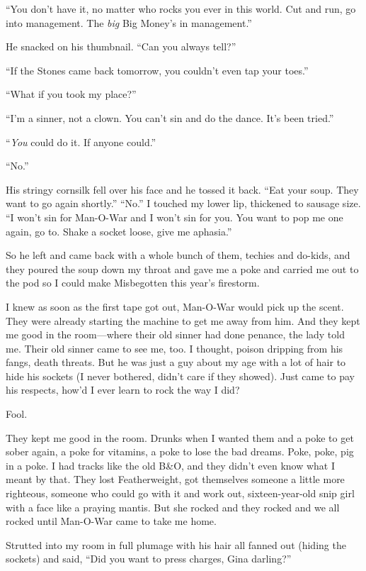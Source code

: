 ``You don't have it, no matter who rocks you ever in this world. Cut and run, go into management. The \textit{big} Big Money's in management.''

He snacked on his thumbnail. ``Can you always tell?''

``If the Stones came back tomorrow, you couldn't even tap your toes.''

``What if you took my place?''

``I'm a sinner, not a clown. You can't sin and do the dance. It's been tried.''

``\textit{You} could do it. If anyone could.''

``No.''

His stringy cornsilk fell over his face and he tossed it back. ``Eat your soup. They want to go again shortly.''
``No.'' I touched my lower lip, thickened to sausage size. ``I won't sin for Man-O-War and I won't sin for you. You want to pop me one again, go to. Shake a socket loose, give me aphasia.''

So he left and came back with a whole bunch of them, techies and do-kids, and they poured the soup down my throat and gave me a poke and carried me out to the pod so I could make Misbegotten this year's firestorm.

I knew as soon as the first tape got out, Man-O-War would pick up the scent. They were already starting the machine to get me away from him. And they kept me good in the room—where their old sinner had done penance, the lady told me. Their old sinner came to see me, too. I thought, poison dripping from his fangs, death threats. But he was just a guy about my age with a lot of hair to hide his sockets (I never bothered, didn't care if they showed). Just came to pay his respects, how'd I ever learn to rock the way I did?

Fool.

They kept me good in the room. Drunks when I wanted them and a poke to get sober again, a poke for vitamins, a poke to lose the bad dreams. Poke, poke, pig in a poke. I had tracks like the old B\&O, and they didn't even know what I meant by that. They lost Featherweight, got themselves someone a little more righteous, someone who could go with it and work out, sixteen-year-old snip girl with a face like a praying mantis. But she rocked and they rocked and we all rocked until Man-O-War came to take me home.

Strutted into my room in full plumage with his hair all fanned out (hiding the sockets) and said, ``Did you want to press charges, Gina darling?''

